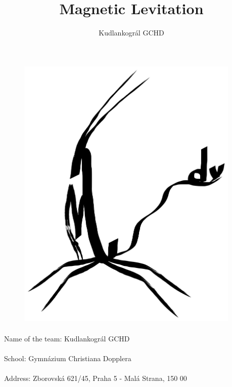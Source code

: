 \documentclass[10pt,a4paper]{article}
\title{Magnetic Levitation}
\author{Kudlankográl GCHD}
\date{}
\makeatletter
\newcommand{\settitle}{\@maketitle}
\makeatother
\begin{document}
\settitle
\thispagestyle{empty}
\addtocounter{page}{-1}


\begin{figure}[H]
\centering
    \includegraphics[width=0.95\textwidth]{kudlankogral.png}
\end{figure}

\paragraph{}
Name of the team: Kudlankográl GCHD
\paragraph{}
School: Gymnázium Christiana Dopplera
\paragraph{}
Address: Zborovská 621/45, Praha 5 - Malá Strana, 150 00

\clearpage
\newpage


\author{}
\maketitle
\end{document}
